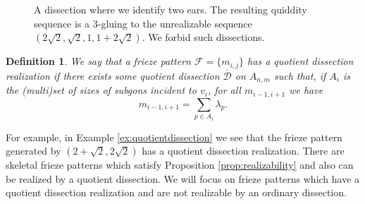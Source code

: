\documentclass[12pt]{article}
\newtheorem{definition}{Definition}
\theoremstyle{remark}
\newcommand*{\F}{\mathcal{F}}
\newcommand*{\D}{\mathcal{D}}
\begin{document}
\begin{figure}
    \centering
    \caption{A dissection where we identify two ears. The resulting quiddity sequence is a $3$-gluing to the unrealizable sequence $(2\sqrt{2}, \sqrt{2}, 1, 1 + 2\sqrt{2})$. We forbid such dissections.}
    \label{fig:QuotientByEars}
\end{figure}




\begin{definition}\label{def:DumplingFrieze}
We say that a frieze pattern $\F = \{m_{i,j}\}$ has a \emph{quotient dissection realization} if there exists some quotient dissection $\overline{\D}$ on $A_{n,m}$ such that, if $A_i$ is the (multi)set of sizes of subgons incident to $v_i$, for all $m_{i-1,i+1}$ we have
\[m_{i-1,i+1} =  \sum_{p\in A_i}\lambda_p.\]
\end{definition}

For example, in Example \ref{ex:quotientdissection} we see that the frieze pattern generated by $(2 + \sqrt{2},2\sqrt{2})$ has a quotient dissection realization. There are skeletal frieze patterns which satisfy Proposition \ref{prop:realizability} and also can be realized by a quotient dissection. We will focus on frieze patterns which have a quotient dissection realization and are not realizable by an ordinary dissection. 
\end{document}
